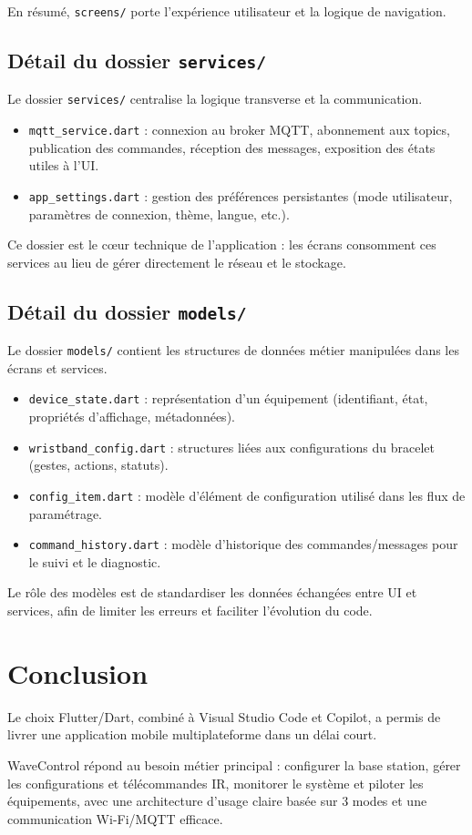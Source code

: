 \documentclass[12pt,a4paper]{report}
\begin{document}
En résumé, \texttt{screens/} porte l’expérience utilisateur et la logique de navigation.

\section{Détail du dossier \texttt{services/}}
Le dossier \texttt{services/} centralise la logique transverse et la communication.

\begin{itemize}[leftmargin=*]
  \item \texttt{mqtt\_service.dart} : connexion au broker MQTT, abonnement aux topics, publication des commandes, réception des messages, exposition des états utiles à l’UI.
  \item \texttt{app\_settings.dart} : gestion des préférences persistantes (mode utilisateur, paramètres de connexion, thème, langue, etc.).
\end{itemize}

Ce dossier est le cœur technique de l’application : les écrans consomment ces services au lieu de gérer directement le réseau et le stockage.

\section{Détail du dossier \texttt{models/}}
Le dossier \texttt{models/} contient les structures de données métier manipulées dans les écrans et services.

\begin{itemize}[leftmargin=*]
  \item \texttt{device\_state.dart} : représentation d’un équipement (identifiant, état, propriétés d’affichage, métadonnées).
  \item \texttt{wristband\_config.dart} : structures liées aux configurations du bracelet (gestes, actions, statuts).
  \item \texttt{config\_item.dart} : modèle d’élément de configuration utilisé dans les flux de paramétrage.
  \item \texttt{command\_history.dart} : modèle d’historique des commandes/messages pour le suivi et le diagnostic.
\end{itemize}

Le rôle des modèles est de standardiser les données échangées entre UI et services, afin de limiter les erreurs et faciliter l’évolution du code.

\chapter{Conclusion}

Le choix Flutter/Dart, combiné à Visual Studio Code et Copilot, a permis de livrer une application mobile multiplateforme dans un délai court.

WaveControl répond au besoin métier principal : configurer la base station, gérer les configurations et télécommandes IR, monitorer le système et piloter les équipements, avec une architecture d’usage claire basée sur 3 modes et une communication Wi-Fi/MQTT efficace.
\end{document}
